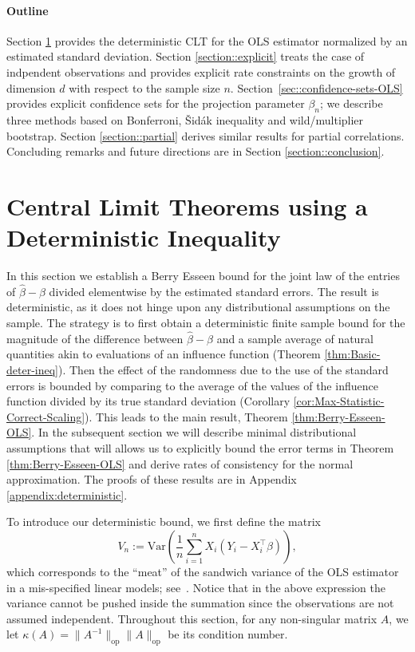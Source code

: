 \documentclass[11pt]{article}
\let\hat\widehat
\begin{document}
\paragraph{Outline}
Section \ref{section::determiniswtic}
provides the deterministic CLT for 
the OLS estimator normalized by an estimated
standard deviation.
Section \ref{section::explicit}
treats the case of indpendent observations
and provides explicit rate constraints on
the growth of dimension $d$ with respect to
the sample size $n$.
Section~\ref{sec::confidence-sets-OLS} provides
explicit confidence sets for the projection 
parameter $\beta_n$; we describe three methods
based on Bonferroni, {\v{S}}id{\'a}k inequality
and wild/multiplier bootstrap.
Section \ref{section::partial}
derives similar results for partial correlations.
Concluding remarks and future directions are in
Section \ref{section::conclusion}.

\section{Central Limit Theorems using a Deterministic Inequality}
\label{section::determiniswtic}
In this section
we establish a Berry Esseen bound
for the joint law
of the entries of $\hat\beta-\beta$ divided elementwise by the estimated
standard errors.
The result is deterministic, as it does not hinge upon any distributional  assumptions on the sample.
The strategy is to first obtain a deterministic finite sample bound
for the magnitude of the difference between $\hat\beta-\beta$
and a sample average of natural quantities akin to evaluations of an influence function
(Theorem \ref{thm:Basic-deter-ineq}).
Then the effect of the randomness
due to the use of the standard errors
is bounded
by comparing to the average of the values of the influence function
divided by its true standard deviation
(Corollary \ref{cor:Max-Statistic-Correct-Scaling}).
This leads to the main result,
Theorem \ref{thm:Berry-Esseen-OLS}.
In the subsequent section we will describe minimal distributional assumptions
that will allows us to explicitly bound
the error terms in
Theorem \ref{thm:Berry-Esseen-OLS} and derive rates of consistency for the normal approximation.
The proofs of these results are in Appendix \ref{appendix:deterministic}. 


To introduce our deterministic bound, we first define the matrix
\[
V_n := \mbox{Var}\left(\frac{1}{n}\sum_{i=1}^n X_i(Y_i - X_i^{\top}\beta)\right),
\]
which corresponds to the ``meat'' of the sandwich variance of the OLS estimator in a mis-specified linear models; see~\cite{Buja14}.
Notice that in the above expression the variance cannot be pushed inside the summation since the observations are not assumed independent. Throughout this section, for any non-singular matrix $A$, we let $\kappa(A) = \|A^{-1}\|_{\mathrm{op}}\|A\|_{\mathrm{op}}$ be its condition number.
\end{document}
